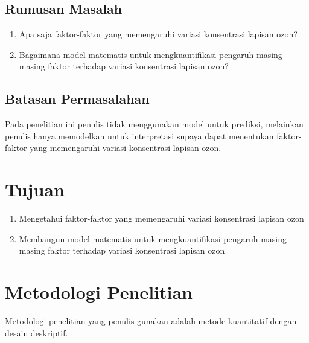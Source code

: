 \subsection{Rumusan Masalah}
\begin{enumerate}
    \item Apa saja faktor-faktor yang memengaruhi variasi konsentrasi lapisan ozon?
    \item Bagaimana model matematis untuk mengkuantifikasi pengaruh masing-masing faktor terhadap variasi konsentrasi lapisan ozon?
\end{enumerate}


\subsection{Batasan Permasalahan}
Pada penelitian ini penulis tidak menggunakan model untuk prediksi, melainkan penulis hanya memodelkan untuk interpretasi supaya dapat menentukan faktor-faktor yang memengaruhi variasi konsentrasi lapisan ozon.


\section{Tujuan}
\begin{enumerate}
    \item Mengetahui faktor-faktor yang memengaruhi variasi konsentrasi lapisan ozon
    \item Membangun model matematis untuk mengkuantifikasi pengaruh masing-masing faktor terhadap variasi konsentrasi lapisan ozon
\end{enumerate}

\section{Metodologi Penelitian}
Metodologi penelitian yang penulis gunakan adalah metode kuantitatif dengan desain deskriptif.

